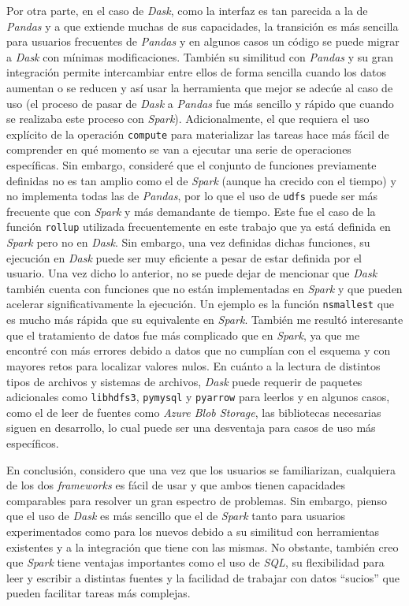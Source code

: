 Por otra parte, en el caso de \textit{Dask}, como la interfaz es tan parecida a la de \textit{Pandas} y a que extiende muchas de sus capacidades, la transición es más sencilla para usuarios frecuentes de \textit{Pandas} y en algunos casos un código se puede migrar a \textit{Dask} con mínimas modificaciones. También su similitud con \textit{Pandas} y su gran integración permite intercambiar entre ellos de forma sencilla cuando los datos aumentan o se reducen y así usar la herramienta que mejor se adecúe al caso de uso (el proceso de pasar de \textit{Dask} a \textit{Pandas} fue más sencillo y rápido que cuando se realizaba este proceso con \textit{Spark}). Adicionalmente, el que requiera el uso explícito de la operación \texttt{compute} para materializar las tareas hace más fácil de comprender en qué momento se van a ejecutar una serie de operaciones específicas. Sin embargo, consideré que el conjunto de funciones previamente definidas no es tan amplio como el de \textit{Spark} (aunque ha crecido con el tiempo) y no implementa todas las de \textit{Pandas}, por lo que el uso de \texttt{udfs} puede ser más frecuente que con \textit{Spark} y más demandante de tiempo. Este fue el caso de la función \texttt{rollup} utilizada frecuentemente en este trabajo que ya está definida en \textit{Spark} pero no en \textit{Dask}. Sin embargo, una vez definidas dichas funciones, su ejecución en \textit{Dask} puede ser muy eficiente a pesar de estar definida por el usuario. Una vez dicho lo anterior, no se puede dejar de mencionar que \textit{Dask} también cuenta con funciones que no están implementadas en \textit{Spark} y que pueden acelerar significativamente la ejecución. Un ejemplo es la función \texttt{nsmallest} que es mucho más rápida que su equivalente en \textit{Spark}. También me resultó interesante que el tratamiento de datos fue más complicado que en \textit{Spark}, ya que me encontré con más errores debido a datos que no cumplían con el esquema y con mayores retos para localizar valores nulos. En cuánto a la lectura de distintos tipos de archivos y sistemas de archivos, \textit{Dask} puede requerir de paquetes adicionales como \texttt{libhdfs3}, \texttt{pymysql} y \texttt{pyarrow} para leerlos y en algunos casos, como el de leer de fuentes como \textit{Azure Blob Storage}, las bibliotecas necesarias siguen en desarrollo, lo cual puede ser una desventaja para casos de uso más específicos.

En conclusión, considero que una vez que los usuarios se familiarizan, cualquiera de los dos \textit{frameworks} es fácil de usar y que ambos tienen capacidades comparables para resolver un gran espectro de problemas. Sin embargo, pienso que el uso de \textit{Dask} es más sencillo que el de \textit{Spark} tanto para usuarios experimentados como para los nuevos debido a su similitud con herramientas existentes y a la integración que tiene con las mismas. No obstante, también creo que \textit{Spark} tiene ventajas importantes como el uso de \textit{SQL}, su flexibilidad para leer y escribir a distintas fuentes y la facilidad de trabajar con datos ``sucios'' que pueden facilitar tareas más complejas.

